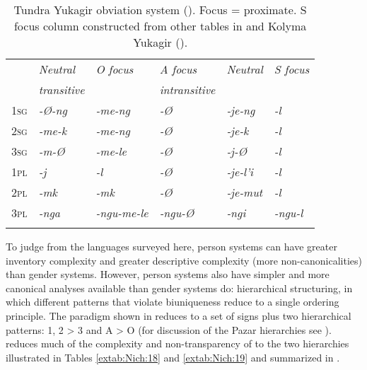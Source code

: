 \documentclass[output=collectionpaper]{langsci/langscibook}
\begin{document}
\begin{table}[t]
\caption{Tundra Yukagir obviation system (\citealt[18]{Maslov2003}).  Focus = proximate. S focus column constructed from other tables in \citet{Maslov2003} and Kolyma Yukagir (\citealt{Maslov2003a}).}
\label{extab:Nich:17}

\begin{tabularx}{\textwidth}{X>{\itshape}X>{\itshape}X>{\itshape}X>{\itshape}X>{\itshape}l}
\lsptoprule
	 &	\normalfont Neutral &	\normalfont O focus	 &\normalfont A focus &	\normalfont Neutral &\normalfont 	S focus  \\
	 &	\normalfont transitive	 &	 &	\normalfont intransitive  &\\
			 \midrule
\noalign{}
	\textsc{1sg} &	-Ø-ng &	-me-ng &	-Ø &	-je-ng &	-l \\
	\textsc{2sg} &	-me-k &	-me-ng &	-Ø &	-je-k &	-l \\
	\textsc{3sg} &	-m-Ø	 &	-me-le &	-Ø &	-j-Ø	 & -l \\
\noalign{}
	\textsc{1pl} &	-j &	-l &	-Ø &	-je-l'i	 & -l \\
	\textsc{2pl} &	-mk &-mk &	-Ø &	-je-mut &	-l \\
	\textsc{3pl} &	-nga &	-ngu-me-le &	-ngu-Ø &	-ngi	 & -ngu-l
\\\lspbottomrule\end{tabularx}
\end{table}

To judge from the languages surveyed here, person systems can have greater inventory complexity and greater descriptive complexity (more non-canonical\-i\-ties) than gender systems. However, person systems also have simpler and more canonical analyses available than gender systems do: hierarchical structuring, in which different patterns that violate biuniqueness reduce to a single ordering principle. The  paradigm shown in  reduces to a set of signs plus two hierarchical patterns: 1, 2 > 3 and A > O (for discussion of the Pazar  hierarchies see \citealt[48]{Oeztuerk2011}). \citet[17, 20]{Maslov2003} reduces much of the complexity and non-transparency of  to the two hierarchies illustrated in Tables \ref{extab:Nich:18} and \ref{extab:Nich:19} and summarized in .
\end{document}
